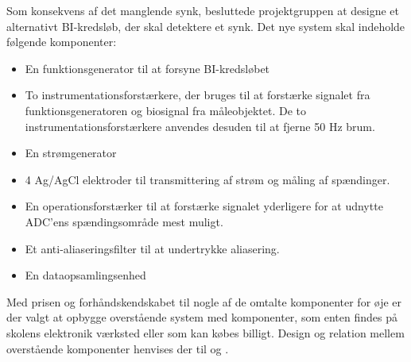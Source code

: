 Som konsekvens af det manglende synk, besluttede projektgruppen at designe et alternativt BI-kredsløb, der skal detektere et synk. Det nye system skal indeholde følgende komponenter:

\begin{itemize}
\item En funktionsgenerator til at forsyne BI-kredsløbet
\item To instrumentationsforstærkere, der bruges til at forstærke signalet fra funktionsgeneratoren og biosignal fra måleobjektet. De to  instrumentationsforstærkere anvendes desuden til at fjerne 50 Hz brum. 
\item En strømgenerator 
\item 4 Ag/AgCl elektroder til transmittering af strøm og måling af spændinger.
\item En operationsforstærker til at forstærke signalet yderligere for at udnytte ADC'ens spændingsområde mest muligt.

\item Et anti-aliaseringsfilter til at undertrykke aliasering. 
\item En dataopsamlingsenhed

\end{itemize}


 

Med prisen og forhåndskendskabet til nogle af de omtalte komponenter for øje er der valgt at opbygge overstående system  med komponenter, som enten findes på skolens elektronik værksted eller som kan købes billigt. Design og relation mellem overstående komponenter henvises der til  og . 